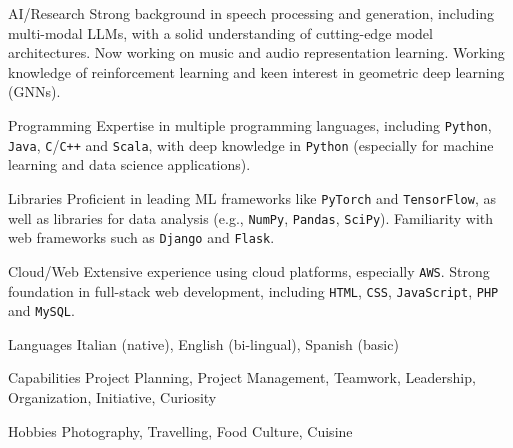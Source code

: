 

\begin{cvskills}
  \cvskill
    {AI/Research}
    {Strong background in speech processing and generation, including multi-modal LLMs, with a solid understanding of cutting-edge model architectures. Now working on music and audio representation learning. Working knowledge of reinforcement learning and keen interest in geometric deep learning (GNNs).}
  
  \cvskill
    {Programming}
    {Expertise in multiple programming languages, including \texttt{Python}, \texttt{Java}, \texttt{C}/\texttt{C++} and \texttt{Scala}, with deep knowledge in \texttt{Python} (especially for machine learning and data science applications).}

  \cvskill
    {Libraries}
    {Proficient in leading ML frameworks like \texttt{PyTorch} and \texttt{TensorFlow}, as well as libraries for data analysis (e.g., \texttt{NumPy}, \texttt{Pandas}, \texttt{SciPy}). Familiarity with web frameworks such as \texttt{Django} and \texttt{Flask}.}

  \cvskill
    {Cloud/Web}
    {Extensive experience using cloud platforms, especially \texttt{AWS}. Strong foundation in full-stack web development, including \texttt{HTML}, \texttt{CSS}, \texttt{JavaScript}, \texttt{PHP} and \texttt{MySQL}.}
\end{cvskills}



\begin{cvskills}
  \hspace{4.0mm}
  \cvskill
    {Languages}
    {Italian (native), English (bi-lingual), Spanish (basic)}
  
  \cvskill
    {Capabilities}
    {Project Planning, Project Management, Teamwork, Leadership, Organization, Initiative, Curiosity}

  \cvskill
    {Hobbies}
    {Photography, Travelling, Food Culture, Cuisine}
\end{cvskills}
